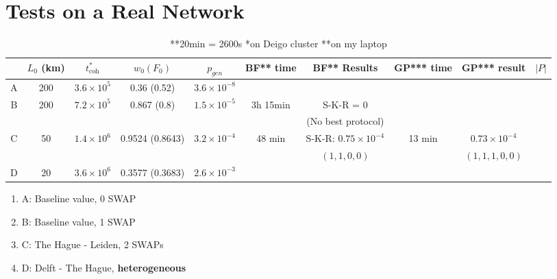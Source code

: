 \documentclass{article}
\begin{document}
\section*{Tests on a Real Network}

\begin{table}[h!]
    \centering
    \begin{tabular}{|c|c|c|c|c|c|c|c|c|c|}
        \hline
        & $L_0$ (km) & $t_{\text{coh}}^*$ & $w_0 (F_0)$ & $p_{gen}$ & BF** time & BF** Results & GP*** time & GP*** result & $|P|$ \\
        \hline
        \hline
        A & 200  & $3.6 \times 10^5$ & 0.36 (0.52) & $3.6 \times 10^{-8}$ & & & & & \\
        \hline
        B & 200  & $7.2 \times 10^5$ & 0.867 (0.8) & $1.5 \times 10^{-5}$ & 3h 15min & S-K-R = 0 & & & \\
        & & & & & & (No best protocol) & & & \\
        \hline
        C & 50  & $1.4 \times 10^6$ & 0.9524 (0.8643) & $3.2 \times 10^{-4}$ & 48 min & S-K-R: $0.75 \times 10^{-4}$ & 13 min & $0.73 \times 10^{-4}$ & \\
        & & & & & & $(1,1,0,0)$ & & $(1,1,1,0,0)$ & \\
        \hline
        D & 20  & $3.6 \times 10^6$ & 0.3577 (0.3683) & $2.6 \times 10^{-3}$ & & & & & \\
        \hline
    \end{tabular}
    \caption{**20min = 2600s \quad **on Deigo cluster \quad ***on my laptop}
\end{table}

\begin{enumerate}
    \item A: Baseline value, 0 SWAP
    \item B: Baseline value, 1 SWAP
    \item C: The Hague - Leiden, 2 SWAPs
    \item D: Delft - The Hague, \textbf{heterogeneous}
\end{enumerate}
\end{document}
